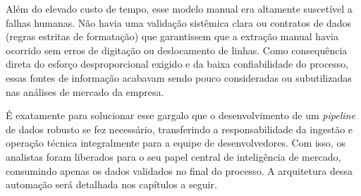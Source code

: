 Além do elevado custo de tempo, esse modelo manual era altamente suscetível a falhas humanas. Não havia uma validação sistêmica clara ou contratos de dados (regras estritas de formatação) que garantissem que a extração manual havia ocorrido sem erros de digitação ou deslocamento de linhas. Como consequência direta do esforço desproporcional exigido e da baixa confiabilidade do processo, essas fontes de informação acabavam sendo pouco consideradas ou subutilizadas nas análises de mercado da empresa.

É exatamente para solucionar esse gargalo que o desenvolvimento de um \textit{pipeline} de dados robusto se fez necessário, transferindo a responsabilidade da ingestão e operação técnica integralmente para a equipe de desenvolvedores. Com isso, os analistas foram liberados para o seu papel central de inteligência de mercado, consumindo apenas os dados validados no final do processo. A arquitetura dessa automação será detalhada nos capítulos a seguir.